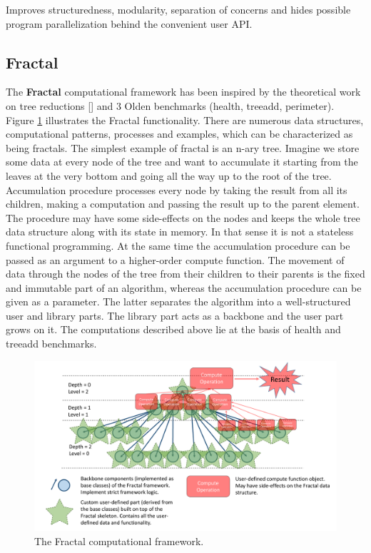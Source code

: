 \quad Improves structuredness, modularity, separation of concerns and hides possible program parallelization behind the convenient user API.  

\subsection{Fractal}
\label{computational_frameworks_fractal}
\quad The \textbf{Fractal} computational framework has been inspired by the theoretical work on tree reductions [] and 3 Olden benchmarks (health, treeadd, perimeter). Figure \ref{fig:fractal} illustrates the Fractal functionality.\newline\null
\quad There are numerous data structures, computational patterns, processes and examples, which can be characterized as being fractals.\newline\null
\quad The simplest example of fractal is an n-ary tree. Imagine we store some data at every node of the tree and want to accumulate it starting from the leaves at the very bottom and going all the way up to the root of the tree. Accumulation procedure processes every node by taking the result from all its children, making a computation and passing the result up to the parent element. The procedure may have some side-effects on the nodes and keeps the whole tree data structure along with its state in memory. In that sense it is not a stateless functional programming. At the same time the accumulation procedure can be passed as an argument to a higher-order compute function. The movement of data through the nodes of the tree from their children to their parents is the fixed and immutable part of an algorithm, whereas the accumulation procedure can be given as a parameter. The latter separates the algorithm into a well-structured user and library parts. The library part acts as a backbone and the user part grows on it. The computations described above lie at the basis of health and treeadd benchmarks.\newline\null
\begin{figure}[ht]
\includegraphics[width=1.0\textwidth]{images/Fractal.pdf}
\caption{The Fractal computational framework.}
\label{fig:fractal}
\end{figure}
